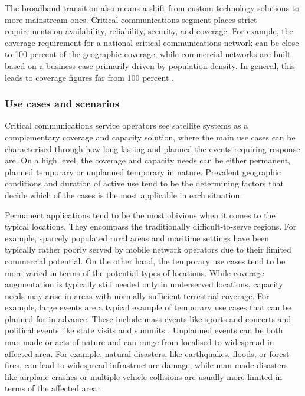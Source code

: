 \documentclass[english, 12pt, a4paper, elec, utf8, a-1b, online]{aaltothesis}
\begin{document}
The broadband transition also means a shift from custom technology solutions to more mainstream ones. Critical communications segment places strict requirements on availability, reliability, security, and coverage. For example, the coverage requirement for a national critical communications network can be close to 100 percent of the geographic coverage, while commercial networks are built based on a business case primarily driven by population density. In general, this leads to coverage figures far from 100 percent \cite{saynevirta2021satellite}.

\subsubsection{Use cases and scenarios}

Critical communications service operators see satellite systems as a complementary coverage and capacity solution, where the main use cases can be characterised through how long lasting and planned the events requiring response are.
On a high level, the coverage and capacity needs can be either permanent, planned temporary or unplanned temporary in nature.
Prevalent geographic conditions and duration of active use tend to be the determining factors that decide which of the cases is the most applicable in each situation.

Permanent applications tend to be the most obivious when it comes to the typical locations. They encompass the traditionally difficult-to-serve regions.
For example, sparcely populated rural areas and maritime settings have been typically rather poorly served by mobile network operators due to their limited commercial potential.
On the other hand, the temporary use cases tend to be more varied in terms of the potential types of locations. While coverage augmentation is typically still needed only in underserved locations, capacity needs may arise in areas with normally sufficient terrestrial coverage.
For example, large events are a typical example of temporary use cases that can be planned for in advance. These include mass events like sports and concerts and political events like state visits and summits \cite{erve2018trump, tcca2021airbus, airbus2023bahrain}.
Unplanned events can be both man-made or acts of nature and can range from localised to widespread in affected area. For example, natural disasters, like earthquakes, floods, or forest fires, can lead to widespread infrastructure damage, while man-made disasters like airplane crashes or multiple vehicle collisions are usually more limited in terms of the affected area \cite{firstnet2021wildfire, firstnet2021nashville}.
\end{document}
